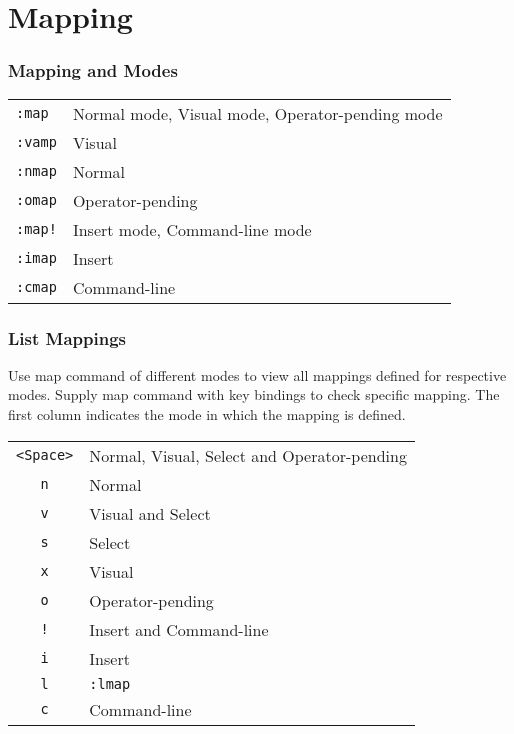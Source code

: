 \part{Mapping}
\section{Mapping and Modes}
\begin{table}
  \centering
  \begin{tabular}{ll}
    \verb|:map|&Normal mode, Visual mode, Operator-pending mode\\
    \verb|:vamp|&Visual\\
    \verb|:nmap|&Normal\\
    \verb|:omap|&Operator-pending\\
    \verb|:map!|&Insert mode, Command-line mode\\
    \verb|:imap|&Insert\\
    \verb|:cmap|&Command-line
  \end{tabular}
\end{table}
\section{List Mappings}
Use map command of different modes to view all mappings defined for respective modes. Supply map command with key bindings to check specific mapping. The first column indicates the mode in which the mapping is defined.
\begin{table}
  \centering
  \begin{tabular}{cl}
    \verb|<Space>|&Normal, Visual, Select and Operator-pending\\
    \verb|n|&Normal\\
    \verb|v|&Visual and Select\\
    \verb|s|&Select\\
    \verb|x|&Visual\\
    \verb|o|&Operator-pending\\
    \verb|!|&Insert and Command-line\\
    \verb|i|&Insert\\
    \verb|l|&\verb|:lmap|\\
    \verb|c|&Command-line
  \end{tabular}
\end{table}

